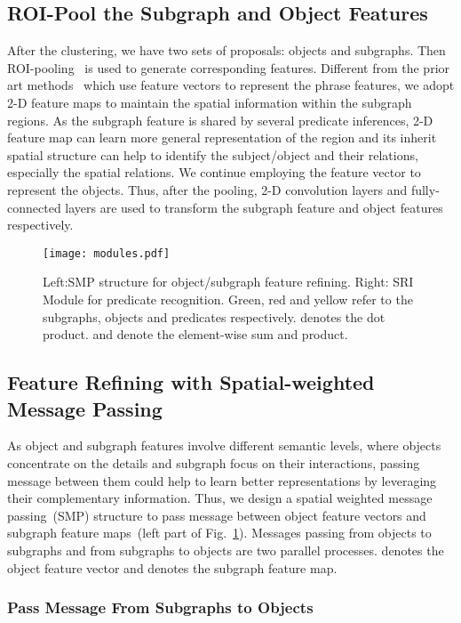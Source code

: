 \documentclass[runningheads]{llncs}
\begin{document}
\subsection{ROI-Pool the Subgraph and Object Features}
After the clustering, we have two sets of proposals: objects and subgraphs. Then ROI-pooling~\cite{fast_rcnn,he2017mask} is used to generate corresponding features. Different from the prior art methods~\cite{xu2017scene,li2017scene} which use feature vectors to represent the phrase features, we adopt 2-D feature maps to maintain the spatial information within the subgraph regions. As the subgraph feature is shared by several predicate inferences, 2-D feature map can learn more general representation of the region and its inherit spatial structure can help to identify the subject/object and their relations, especially the spatial relations. We continue employing the feature vector to represent the objects. Thus, after the pooling, 2-D convolution layers and fully-connected layers are used to transform the subgraph feature and object features respectively. 



\begin{figure}[t]
	\texttt{[image: modules.pdf]}
	\caption{Left:SMP structure for object/subgraph feature refining. Right: SRI Module for predicate recognition. Green, red and yellow  refer to the subgraphs, objects and predicates respectively.  denotes the dot product.  and  denote the element-wise sum and product.}
	\label{fig:modules}
\end{figure}


\subsection{Feature Refining with Spatial-weighted Message Passing} 
As object and subgraph features involve different semantic levels, where objects concentrate on the details and subgraph focus on their interactions, passing message between them could help to learn better representations by leveraging their complementary information. Thus, we design a spatial weighted message passing~(SMP) structure to pass message between object feature vectors and subgraph feature maps~(left part of Fig.~\ref{fig:modules}). Messages passing from objects to subgraphs and from subgraphs to objects are two parallel processes.  denotes the object feature vector and  denotes the subgraph feature map. 



\subsubsection{Pass Message From Subgraphs to Objects}
\end{document}

